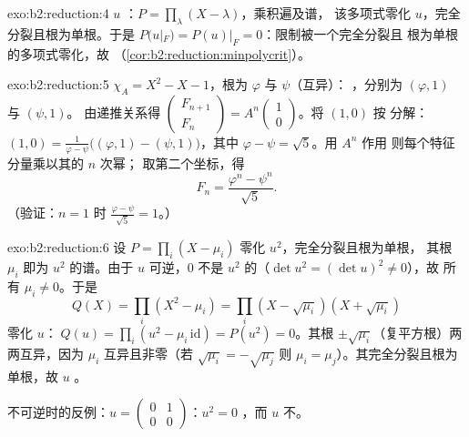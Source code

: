 \begin{solution}{exo:b2:reduction:4}
$u$ ：$P = \prod_{\lambda}(X - \lambda)$，乘积遍及谱，
该多项式零化 $u$，完全分裂且根为单根。于是 $P(u|_F) =
P(u)|_F = 0$：限制被一个完全分裂且
根为单根的多项式零化，故
（\cref{cor:b2:reduction:minpolycrit}）。
\end{solution}

\begin{solution}{exo:b2:reduction:5}
$\chi_A = X^2 - X - 1$，根为 $\varphi$ 与 $\psi$（互异）：
，分别为 $(\varphi, 1)$ 与 $(\psi, 1)$。
由递推关系得 $\begin{pmatrix} F_{n+1}\\ F_n \end{pmatrix} =
A^n \begin{pmatrix}1\\ 0\end{pmatrix}$。将 $(1, 0)$ 按
分解：$(1,0) = \frac{1}{\varphi - \psi}\bigl((\varphi, 1) -
(\psi, 1)\bigr)$，其中 $\varphi - \psi = \sqrt5$。用 $A^n$ 作用
则每个特征分量乘以其的 $n$ 次幂；
取第二个坐标，得
\[
F_n = \frac{\varphi^n - \psi^n}{\sqrt 5} .
\]
（验证：$n = 1$ 时 $\frac{\varphi - \psi}{\sqrt5} = 1$。）
\end{solution}

\begin{solution}{exo:b2:reduction:6}
设 $P = \prod_i (X - \mu_i)$ 零化 $u^2$，完全分裂且根为单根，
其根 $\mu_i$ 即为 $u^2$ 的谱。由于 $u$ 可逆，$0$
不是 $u^2$ 的（$\det u^2 = (\det u)^2 \neq 0$），故
所有 $\mu_i \neq 0$。于是
\[
Q(X) = \prod_i (X^2 - \mu_i) = \prod_i (X - \sqrt{\mu_i})(X +
\sqrt{\mu_i})
\]
零化 $u$：$\;Q(u) = \prod_i (u^2 - \mu_i\,\mathrm{id}) =
P(u^2) = 0$。其根 $\pm
\sqrt{\mu_i}$（复平方根）两两互异，因为
$\mu_i$ 互异且非零（若 $\sqrt{\mu_i} = -\sqrt{\mu_j}$
则 $\mu_i = \mu_j$）。其完全分裂且根为单根，故
$u$ 。

不可逆时的反例：$u = \begin{pmatrix} 0 & 1\\
0 & 0\end{pmatrix}$：$u^2 = 0$ ，而 $u$ 不。
\end{solution}

